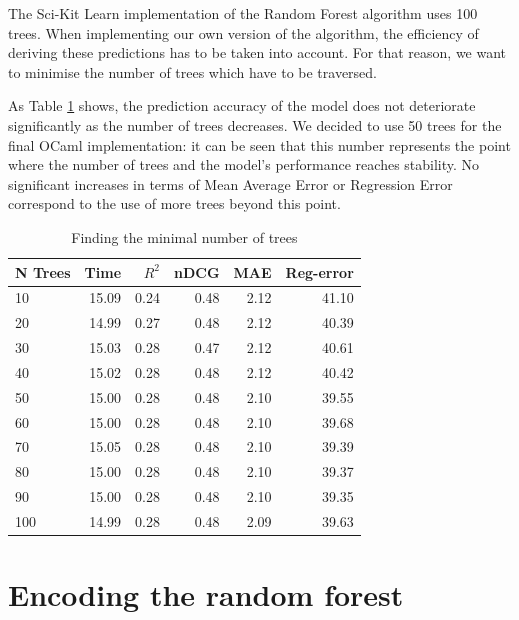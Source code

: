 The Sci-Kit Learn implementation of the Random Forest algorithm uses 100 trees. 
When implementing our own version of the algorithm, the efficiency of deriving these predictions has to be taken into account.
For that reason, we want to minimise the number of trees which have to be traversed.

As Table \ref{table:findtrees} shows, the prediction accuracy of the model does not deteriorate significantly as the number of trees decreases. 
We decided to use 50 trees for the final OCaml implementation: it can be seen that this number represents the point where the number of trees and the model's performance reaches stability.
No significant increases in terms of Mean Average Error or Regression Error correspond to the use of more trees beyond this point.     

\begin{table}
\caption{Finding the minimal number of trees }

	\begin{tabular}{lrrrrr}
		\toprule
		\textbf{N Trees} &  \textbf{Time} & $R^2$ &  \textbf{nDCG} &    \textbf{MAE} &  \textbf{Reg-error} \\
		\midrule
		10 &     15.09 & 0.24 & 0.48 &    2.12 &       41.10 \\
		20 &     14.99 & 0.27 & 0.48 &    2.12 &       40.39 \\
		30 &     15.03 & 0.28 & 0.47 &    2.12 &       40.61 \\
		40 &     15.02 & 0.28 & 0.48 &    2.12 &       40.42 \\
		50 &     15.00 & 0.28 & 0.48 &    2.10 &       39.55 \\
		60 &     15.00 & 0.28 & 0.48 &    2.10 &       39.68 \\
		70 &     15.05 & 0.28 & 0.48 &    2.10 &       39.39 \\
		80 &     15.00 & 0.28 & 0.48 &    2.10 &       39.37 \\
		90 &     15.00 & 0.28 & 0.48 &    2.10 &       39.35 \\
		100&	 14.99 & 0.28 & 0.48 &    2.09 &       39.63 \\
		\bottomrule
	\end{tabular}
	\label{table:findtrees}

\end{table}    


\section{Encoding the random forest}
\label{sec:encoding}

